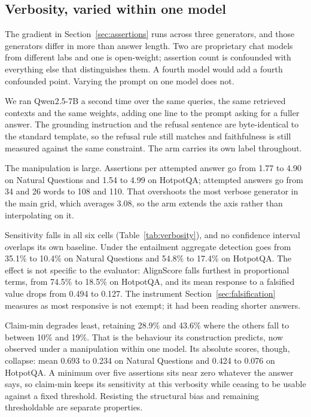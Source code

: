 \documentclass[11pt]{article}
\begin{document}
\subsection{Verbosity, varied within one model}
\label{sec:verbosity}

The gradient in Section~\ref{sec:assertions} runs across three generators, and those generators differ in more than answer length. Two are proprietary chat models from different labs and one is open-weight; assertion count is confounded with everything else that distinguishes them. A fourth model would add a fourth confounded point. Varying the prompt on one model does not.

We ran Qwen2.5-7B a second time over the same queries, the same retrieved contexts and the same weights, adding one line to the prompt asking for a fuller answer. The grounding instruction and the refusal sentence are byte-identical to the standard template, so the refusal rule still matches and faithfulness is still measured against the same constraint. The arm carries its own label throughout.

The manipulation is large. Assertions per attempted answer go from 1.77 to 4.90 on Natural Questions and 1.54 to 4.99 on HotpotQA; attempted answers go from 34 and 26 words to 108 and 110. That overshoots the most verbose generator in the main grid, which averages 3.08, so the arm extends the axis rather than interpolating on it.

Sensitivity falls in all six cells (Table~\ref{tab:verbosity}), and no confidence interval overlaps its own baseline. Under the entailment aggregate detection goes from 35.1\% to 10.4\% on Natural Questions and 54.8\% to 17.4\% on HotpotQA. The effect is not specific to the evaluator: AlignScore falls furthest in proportional terms, from 74.5\% to 18.5\% on HotpotQA, and its mean response to a falsified value drops from 0.494 to 0.127. The instrument Section~\ref{sec:falsification} measures as most responsive is not exempt; it had been reading shorter answers.

Claim-min degrades least, retaining 28.9\% and 43.6\% where the others fall to between 10\% and 19\%. That is the behaviour its construction predicts, now observed under a manipulation within one model. Its absolute scores, though, collapse: mean 0.693 to 0.234 on Natural Questions and 0.424 to 0.076 on HotpotQA. A minimum over five assertions sits near zero whatever the answer says, so claim-min keeps its sensitivity at this verbosity while ceasing to be usable against a fixed threshold. Resisting the structural bias and remaining thresholdable are separate properties.
\end{document}
